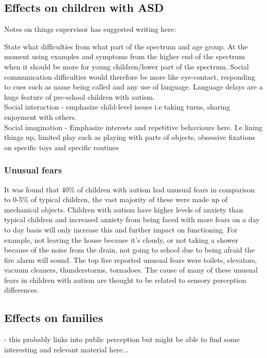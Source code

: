 \documentclass[11pt]{report}
\begin{document}
\subsection{Effects on children with ASD}

Notes on things supervisor has suggested writing here:

State what difficulties from what part of the spectrum and age group. At the moment using examples and symptoms from the higher end of the spectrum when it should be more for young children/lower part of the spectrum. Social communication difficulties would therefore be more like eye-contact, responding to cues such as name being called and any use of language. Language delays are a huge feature of pre-school children with autism.\\
Social interaction - emphasize child-level issues i.e taking turns, sharing enjoyment with others.\\
Social imagination - Emphasize interests and repetitive behaviours here. I.e lining things up, limited play such as playing with parts of objects, obsessive fixations on specific toys and specific routines\\

\subsubsection{Unusual fears}
It was found that 40\% of children with autism had unusual fears in comparison to 0-5\% of typical children, the vast majority of these were made up of mechanical objects. Children with autism have higher levels of anxiety than typical children\cite{fears} and increased anxiety from being faced with more fears on a day to day basis will only increase this and further impact on functioning. For example, not leaving the house because it's cloudy, or not taking a shower because of the noise from the drain, not going to school due to being afraid the fire alarm will sound. The top five reported unusual fears were toilets, elevators, vacuum cleaners, thunderstorms, tornadoes. The cause of many of these unusual fears in children with autism are thought to be related to sensory perception differences\cite{fears}.

\subsection{Effects on families}
- this probably links into public perception but might be able to find some interesting and relevant material here...
\end{document}
